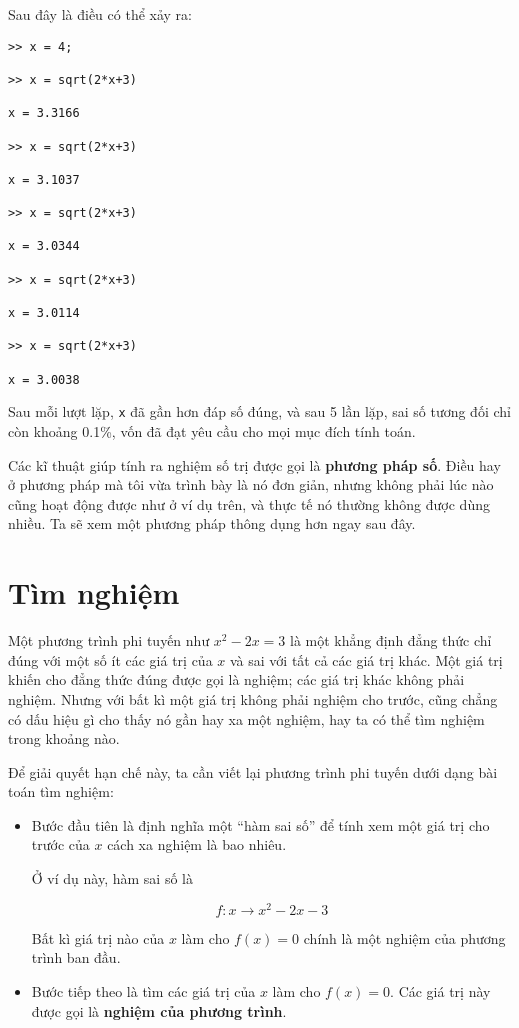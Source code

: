 \documentclass[12pt]{book}
\begin{document}
Sau đây là điều có thể xảy ra:

\begin{verbatim}
>> x = 4;

>> x = sqrt(2*x+3)

x = 3.3166

>> x = sqrt(2*x+3)

x = 3.1037

>> x = sqrt(2*x+3)

x = 3.0344

>> x = sqrt(2*x+3)

x = 3.0114

>> x = sqrt(2*x+3)

x = 3.0038
\end{verbatim}

Sau mỗi lượt lặp, {\tt x} đã gần hơn đáp số đúng,
và sau 5 lần lặp, sai số tương đối chỉ còn khoảng 0.1\%, vốn
đã đạt yêu cầu cho mọi mục đích tính toán.

Các kĩ thuật giúp tính ra nghiệm số trị được gọi là 
{\bf phương pháp số}. Điều hay ở phương pháp mà tôi vừa
trình bày là nó đơn giản, nhưng không phải lúc nào cũng
hoạt động được như ở ví dụ trên, và thực tế nó thường
không được dùng nhiều. Ta sẽ xem một phương pháp 
thông dụng hơn ngay sau đây.


\section{Tìm nghiệm}
\label{zero}

Một phương trình phi tuyến như $x^2 - 2x = 3$ là một 
khẳng định đẳng thức chỉ đúng với một số ít các giá trị của $x$
và sai với tất cả các giá trị khác. Một giá trị khiến cho đẳng thức
đúng được gọi là nghiệm; các giá trị khác không phải nghiệm.
Nhưng với bất kì một giá trị không phải nghiệm cho trước, cũng
chẳng có dấu hiệu gì cho thấy nó gần hay xa một nghiệm, hay
ta có thể tìm nghiệm trong khoảng nào.

Để giải quyết hạn chế này, ta cần viết lại phương trình
phi tuyến dưới dạng bài toán tìm nghiệm:

\begin{itemize}

\item Bước đầu tiên là định nghĩa một
``hàm sai số'' để tính xem một giá trị cho trước
của $x$ cách xa nghiệm là bao nhiêu.

Ở ví dụ này, hàm sai số là

\[ f : x \to x^2 - 2x -3 \]

Bất kì giá trị nào của $x$ làm cho $f(x) = 0$ chính là một
nghiệm của phương trình ban đầu.

\item Bước tiếp theo là tìm các giá trị của $x$ làm cho
$f(x) = 0$. Các giá trị này được gọi là {\bf nghiệm của phương trình}.

\end{itemize}
\end{document}
